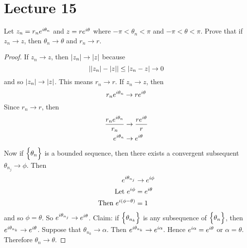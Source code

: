 \documentclass[12pt]{article}
\begin{document}
\section{Lecture 15} 
Let $z_n = r_ne^{i\theta_n}$ and $z = re^{i\theta}$ where $-\pi < \theta_n < \pi$ and $-\pi < \theta < \pi$. Prove that if $z_n \to z$, then $\theta_n \to \theta$ and $r_n \to r$. 
\begin{proof} 
If $z_n \to z$, then $\abs{z_n} \to \abs{z}$ because $$ \abs{ \abs{z_n} - \abs{z} } \leq \abs{z_n - z } \to 0$$ and so $\abs{z_n} \to \abs{z}$. This means $r_n \to r$. If $z_n \to z$, then $$r_n e^{i\theta_n} \to re^{i\theta}$$ Since $r_n \to r$, then $$ \begin{aligned} \frac{r_ne^{i\theta_n}}{r_n} &\to \frac{re^{i\theta}}{r} \\ e^{i\theta_n} &\to e^{i\theta} \end{aligned} $$ Now if $\Big\{ \theta_n \Big\}$ is a bounded sequence, then there exists a convergent subsequent $\theta_{n_j} \to \phi$. Then $$ \begin{aligned} e^{i\theta_{n_j}} &\to e^{i\phi} \\ \text{Let } e^{i\phi} &= e^{i\theta} \\ \text{Then } e^{i(\phi - \theta)} &= 1 \end{aligned} $$ and so $\phi = \theta$. So $e^{i\theta_{n_j}} \to e^{i\theta}$. Claim: if $\Big\{ \theta_{n_k} \Big\}$ is any subsequence of $\Big\{ \theta_n \Big\}$, then $e^{i\theta_{n_k}} \to e^{i\theta}$. Suppose that $\theta_{n_k} \to \alpha$. Then $e^{i\theta_{n_k}} \to e^{i\alpha}$. Hence $e^{i\alpha} = e^{i\theta}$ or $\alpha = \theta$. Therefore $\theta_n \to \theta$. 
\end{proof} 
\end{document}
